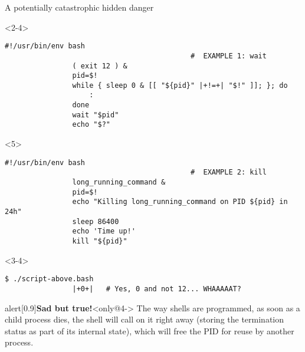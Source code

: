 \begin{frame}[fragile]{A potentially catastrophic hidden danger}
    \begin{overlayarea}{\textwidth}{0.5\textheight}
        \begin{onlyenv}<2-4>
            \begin{lstlisting}[style=MyBash]
                #!/usr/bin/env bash
                                            #  EXAMPLE 1: wait
                ( exit 12 ) &
                pid=$!
                while { sleep 0 & [[ "${pid}" |+!=+| "$!" ]]; }; do
                    :
                done
                wait "$pid"
                echo "$?"
            \end{lstlisting}
        \end{onlyenv}
        \begin{onlyenv}<5>
            \begin{lstlisting}[style=MyBash, emph={[8]long_running_command}, firstnumber=10]
                #!/usr/bin/env bash
                                            #  EXAMPLE 2: kill
                long_running_command &
                pid=$!
                echo "Killing long_running_command on PID ${pid} in 24h"
                sleep 86400
                echo 'Time up!'
                kill "${pid}"
            \end{lstlisting}
            \begin{center}
                \Large {}
            \end{center}
        \end{onlyenv}
        \begin{uncoverenv}<3-4>
            \begin{lstlisting}[style=MyBash, numbers=none, aboveskip=1mm]
                $ ./script-above.bash
                |+0+|   # Yes, 0 and not 12... WHAAAAAT?
            \end{lstlisting}
        \end{uncoverenv}
        \begin{center}
        \end{center}
    \end{overlayarea}
    \begin{varblock}{alert}[0.9\textwidth]{\textbf{Sad but true!}}<only@4->
        The way shells are programmed, as soon as a child process dies, the shell will call  on it right away (storing the termination status as part of its internal state), which will free the PID for reuse by another process.
    \end{varblock}
\end{frame}
